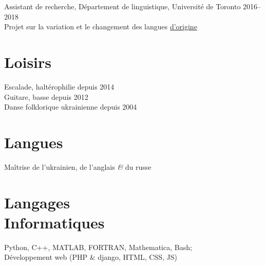 \documentclass[margin,line]{res}
\begin{document}
\begin{resume}
\vspace*{-1mm}

Assistant de recherche, Département de linguistique, Université de Toronto \hfill{2016--2018}\\
Projet sur la variation et le changement des langues \href{https://ngn.artsci.utoronto.ca/HLVC/0_0_home.php}{d'origine}

\section{\sc Loisirs}

Escalade, haltérophilie \hfill{depuis 2014}\\
Guitare, basse \hfill{depuis 2012}\\
Danse folklorique ukrainienne \hfill{depuis 2004}


\section{\sc Langues}

Maîtrise de l'ukrainien, de l'anglais \textit{\&} du russe
\section{\sc Langages \\Informatiques}

Python, C++, MATLAB, FORTRAN, Mathematica, Bash;\\
Développement web (PHP \& django, HTML, CSS, JS)
\end{resume}
\end{document}
